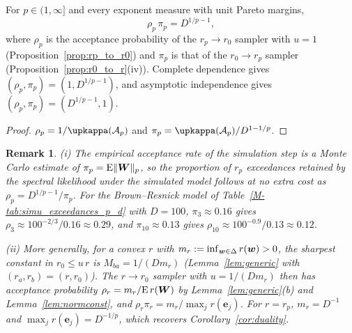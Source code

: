 \documentclass[12pt]{article}
\newtheorem{remark}{Remark}
\newcommand{\bW}{\bm W}
\begin{document}
\begin{corollary}\label{cor:duality}
For $p\in(1,\infty]$ and every exponent measure with unit Pareto margins,
$$
\rho_p\,\pi_p=D^{1/p-1},
$$
where $\rho_p$ is the acceptance probability of the $r_p\to r_0$ sampler with $u=1$ (Proposition~\ref{prop:rp_to_r0}) and $\pi_p$ is that of the $r_0\to r_p$ sampler (Proposition~\ref{prop:r0_to_r}(iv)). Complete dependence gives $(\rho_p,\pi_p)=(1,D^{1/p-1})$, and asymptotic independence gives $(\rho_p,\pi_p)=(D^{1/p-1},1)$.
\end{corollary}

\begin{proof}
$\rho_p=1/\upkappa(\calA_p)$ and $\pi_p=\upkappa(\calA_p)/D^{1-1/p}$.
\end{proof}

\begin{remark}\label{rem:practice}
(i) The empirical acceptance rate of the simulation step is a Monte Carlo estimate of $\pi_p=\E\|\bW\|_p$, so the proportion of $r_p$ exceedances retained by the spectral likelihood under the simulated model follows at no extra cost as $\rho_p=D^{1/p-1}/\pi_p$. For the Brown--Resnick model of Table~\ref{M-tab:simu_exceedances_p_d} with $D=100$, $\pi_3\approx0.16$ gives $\rho_3\approx100^{-2/3}/0.16\approx0.29$, and $\pi_{10}\approx0.13$ gives $\rho_{10}\approx100^{-0.9}/0.13\approx0.12$.

(ii) More generally, for a convex $r$ with $m_r:=\inf_{{\boldsymbol{w}}\in\Delta}r({\boldsymbol{w}})>0$, the sharpest constant in $r_0\leq u\,r$ is $M_{ba}=1/(Dm_r)$ (Lemma~\ref{lem:generic} with $(r_a,r_b)=(r,r_0)$). The $r\to r_0$ sampler with $u=1/(Dm_r)$ then has acceptance probability $\rho_r=m_r/\E\,r(\bW)$ by Lemma~\ref{lem:generic}(b) and Lemma~\ref{lem:normconst}, and $\rho_r\pi_r=m_r/\max_jr(\bm e_j)$. For $r=r_p$, $m_r=D^{-1}$ and $\max_jr(\bm e_j)=D^{-1/p}$, which recovers Corollary~\ref{cor:duality}.
\end{remark}



\end{document}
